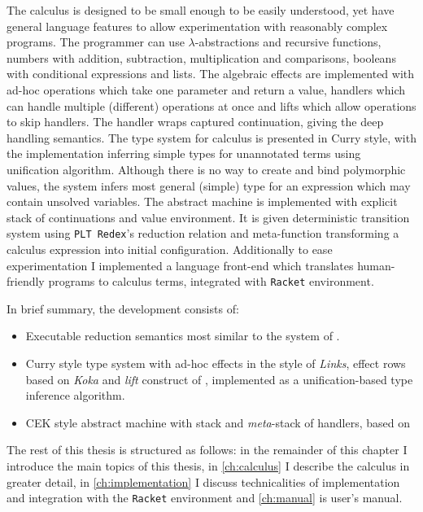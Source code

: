 \documentclass[inz, english, shortabstract]{iithesis}
\newcommand{\Redex}{\texttt{PLT Redex}}
\newcommand{\Racket}{\texttt{Racket}}
\begin{document}
The calculus is designed to be small enough to be easily understood, yet have general language features to allow experimentation with reasonably complex programs.
The programmer can use $\lambda$-abstractions and recursive functions, numbers with addition, subtraction, multiplication and comparisons, booleans with conditional expressions and lists.
The algebraic effects are implemented with ad-hoc operations which take one parameter and return a value, handlers which can handle multiple (different) operations at once and lifts which allow operations to skip handlers.
The handler wraps captured continuation, giving the deep handling semantics.
The type system for calculus is presented in Curry style, with the implementation inferring simple types for unannotated terms using unification algorithm.
Although there is no way to create and bind polymorphic values, the system infers most general (simple) type for an expression which may contain unsolved variables.
The abstract machine is implemented with explicit stack of continuations and value environment.
It is given deterministic transition system using \Redex{}'s reduction relation and meta-function transforming a calculus expression into initial configuration.
Additionally to ease experimentation I implemented a language front-end which translates human-friendly programs to calculus terms, integrated with \Racket{} environment.

In brief summary, the development consists of:
\begin{itemize}
  \item Executable reduction semantics most similar to the system of \cite{Biernacki2017}.
  \item Curry style type system with ad-hoc effects in the style of \emph{Links}, effect rows based on \emph{Koka} and \emph{lift} construct of \cite{Biernacki2017}, implemented as a unification-based type inference algorithm.
  \item CEK style abstract machine with stack and \emph{meta}-stack of handlers, based on \cite{Hillerstrom2016}
\end{itemize}

The rest of this thesis is structured as follows: in the remainder of this chapter I introduce the main topics of this thesis, in \autoref{ch:calculus} I describe the calculus in greater detail, in \autoref{ch:implementation} I discuss technicalities of implementation and integration with the \Racket{} environment and \autoref{ch:manual} is user's manual.
\end{document}
